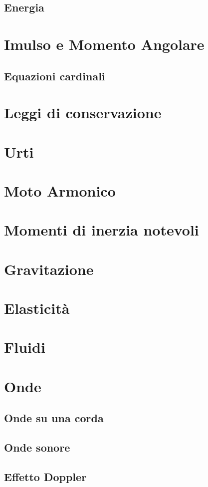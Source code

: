 \documentclass[70pt]{article}
\begin{document}
\begin{small}
\begin{multicols}{3}
	\subsection{Energia}
\section{Imulso e Momento Angolare}
	\subsection{Equazioni cardinali}
\section{Leggi di conservazione}
\section{Urti}
\section{Moto Armonico}
\section{Momenti di inerzia notevoli}
\section{Gravitazione}
\section{Elasticità}
\section{Fluidi}
\section{Onde}
	\subsection{Onde su una corda}
	\subsection{Onde sonore}
	\subsection{Effetto Doppler}

\end{multicols}
\end{small}
\end{document}
